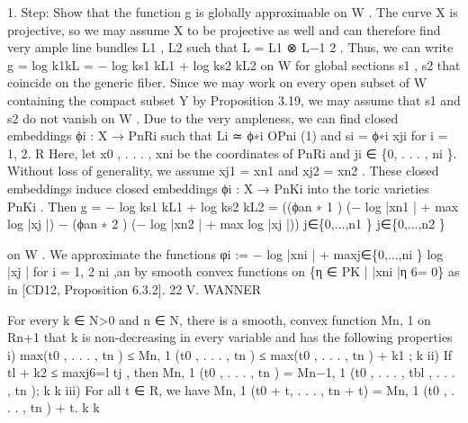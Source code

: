 \documentclass[
  10pt,
]{article}
\newenvironment{Shaded}{}{}
\newcommand{\NormalTok}[1]{#1}
\begin{document}
\begin{Shaded}
\begin{Highlighting}[]
\NormalTok{  1. Step:       Show that the function g is globally approximable on W .}
\NormalTok{  The curve X is projective, so we may assume X to be projective as well and can}
\NormalTok{therefore find very ample line bundles L1 , L2 such that L = L1 ⊗ L−1}
\NormalTok{                                                                   2 . Thus, we can}
\NormalTok{write}
\NormalTok{                       g = log k1kL = − log ks1 kL1 + log ks2 kL2}
\NormalTok{on W for global sections s1 , s2 that coincide on the generic fiber. Since we may work on}
\NormalTok{every open subset of W containing the compact subset Y by Proposition 3.19, we may}
\NormalTok{assume that s1 and s2 do not vanish on W . Due to the very ampleness, we can find}
\NormalTok{closed embeddings ϕi : X → PnRi such that Li ≃ ϕ∗i OPni (1) and si = ϕ∗i xji for i = 1, 2.}
\NormalTok{                                                            R}
\NormalTok{Here, let x0 , . . . , xni be the coordinates of PnRi and ji ∈ \{0, . . . , ni \}. Without loss of}
\NormalTok{generality, we assume xj1 = xn1 and xj2 = xn2 . These closed embeddings induce closed}
\NormalTok{embeddings ϕi : X → PnKi into the toric varieties PnKi . Then}
\NormalTok{  g = − log ks1 kL1 + log ks2 kL2}
\NormalTok{    = ((ϕan ∗}
\NormalTok{         1 ) (− log |xn1 | +      max          log |xj |) − (ϕan ∗}
\NormalTok{                                                              2 ) (− log |xn2 | +      max          log |xj |))}
\NormalTok{                               j∈\{0,...,n1 \}                                        j∈\{0,...,n2 \}}

\NormalTok{on W . We approximate the functions φi := − log |xni | + maxj∈\{0,...,ni \} log |xj | for i = 1, 2}
\NormalTok{                                    ni ,an}
\NormalTok{by smooth convex functions on \{η ∈ PK      | |xni |η 6= 0\} as in [CD12, Proposition 6.3.2].}
\NormalTok{22                                                   V. WANNER}


\NormalTok{   For every k ∈ N\textgreater{}0 and n ∈ N, there is a smooth, convex function Mn, 1 on Rn+1 that}
\NormalTok{                                                                       k}
\NormalTok{is non{-}decreasing in every variable and has the following properties}
\NormalTok{       i) max(t0 , . . . , tn ) ≤ Mn, 1 (t0 , . . . , tn ) ≤ max(t0 , . . . , tn ) + k1 ;}
\NormalTok{                                         k}
\NormalTok{       ii) If tl + k2 ≤ maxj6=l tj , then Mn, 1 (t0 , . . . , tn ) = Mn−1, 1 (t0 , . . . , tbl , . . . , tn );}
\NormalTok{                                              k                            k}
\NormalTok{      iii) For all t ∈ R, we have Mn, 1 (t0 + t, . . . , tn + t) = Mn, 1 (t0 , . . . , tn ) + t.}
\NormalTok{                                                k                                   k}


\end{Highlighting}
\end{Shaded}
\end{document}
